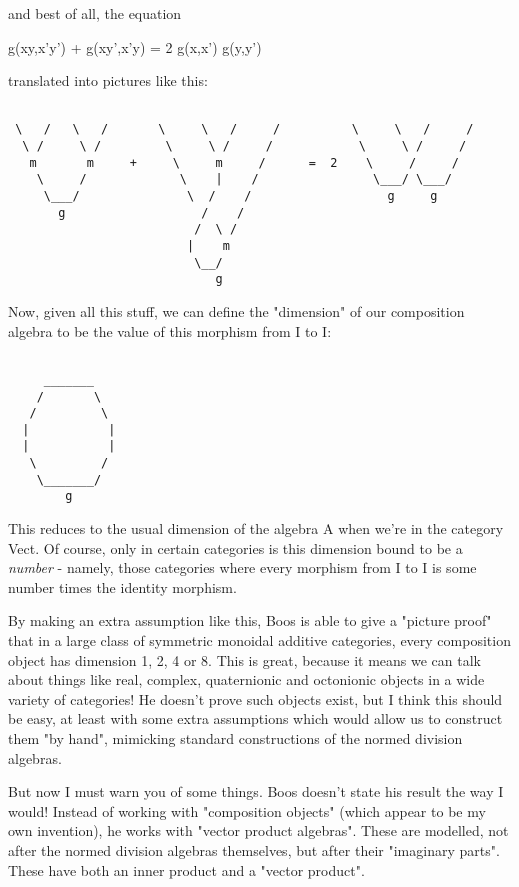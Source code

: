 and best of all, the equation

g(xy,x'y') + g(xy',x'y) = 2 g(x,x') g(y,y')

translated into pictures like this:


\begin{verbatim}

 \   /   \   /       \     \   /     /          \     \   /     /
  \ /     \ /         \     \ /     /            \     \ /     /
   m       m     +     \     m     /      =  2    \     /     /
    \     /             \    |    /                \___/ \___/
     \___/               \  /    /                   g     g
       g                   /    /
                          /  \ /
                         |    m
                          \__/
                             g
\end{verbatim}
    
Now, given all this stuff, we can define the "dimension" of our
composition algebra to be the value of this morphism from I to I:
         

\begin{verbatim}

     _______
    /       \
   /         \
  |           |
  |           |
   \         /
    \_______/
        g
\end{verbatim}
    
This reduces to the usual dimension of the algebra A when we're in 
the category Vect.   Of course, only in certain categories is
this dimension bound to be a \emph{number} - namely, those categories where
every morphism from I to I is some number times the identity morphism.

By making an extra assumption like this, Boos is able to give a
"picture proof" that in a large class of symmetric monoidal
additive categories, every composition object has dimension 1, 2, 4 or
8.  This is great, because it means we can talk about things like real,
complex, quaternionic and octonionic objects in a wide variety of
categories!  He doesn't prove such objects exist, but I think this
should be easy, at least with some extra assumptions which would allow
us to construct them "by hand", mimicking standard
constructions of the normed division algebras.

But now I must warn you of some things.  Boos doesn't state his result
the way I would!  Instead of working with "composition
objects" (which appear to be my own invention), he works with
"vector product algebras".  These are modelled, not after the
normed division algebras themselves, but after their "imaginary
parts".  These have both an inner product and a "vector
product".

